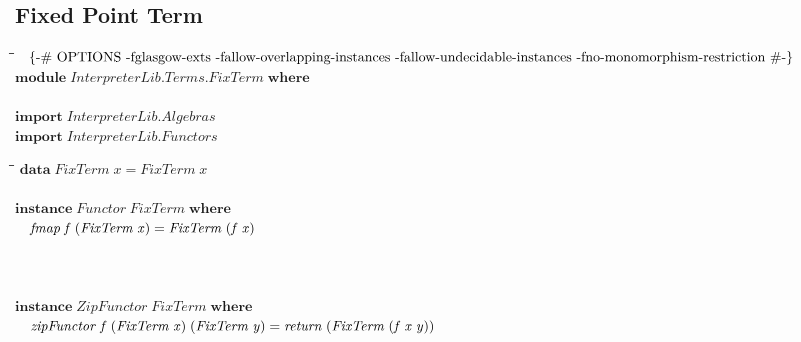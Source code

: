 \documentclass[10pt]{article}
\newlength{\lwidth}\setlength{\lwidth}{4.5cm}
\newlength{\cwidth}\setlength{\cwidth}{8mm} %
\newcommand{\Conid}[1]{\mathit{#1}}
\newcommand{\Varid}[1]{\mathit{#1}}
\begin{document}
\subsection{Fixed Point Term}
\begin{tabbing}
\qquad\=\hspace{\lwidth}\=\hspace{\cwidth}\=\+\kill
${\mbox{\enskip\{-\# OPTIONS -fglasgow-exts -fallow-overlapping-instances -fallow-undecidable-instances -fno-monomorphism-restriction  \#-\}\enskip}}$\\
${\mathbf{module}\;\Conid{\Conid{InterpreterLib}.\Conid{Terms}.FixTerm}\;\mathbf{where}}$\\
${}$\\
${\mathbf{import}\;\Conid{\Conid{InterpreterLib}.Algebras}}$\\
${\mathbf{import}\;\Conid{\Conid{InterpreterLib}.Functors}}$
\end{tabbing}

\begin{tabbing}
\qquad\=\hspace{\lwidth}\=\hspace{\cwidth}\=\+\kill
${\mathbf{data}\;\Conid{FixTerm}\;\Varid{x}\mathrel{=}\Conid{FixTerm}\;\Varid{x}}$\\
${}$\\
${\mathbf{instance}\;\Conid{Functor}\;\Conid{FixTerm}\;\mathbf{where}}$\\
${\hskip1.00em\relax\Varid{fmap}\;\Varid{f}\;(\Conid{FixTerm}\;\Varid{x})\mathrel{=}\Conid{FixTerm}\;(\Varid{f}\;\Varid{x})}$\\
${}$\\
${}$\\
${}$\\
${\mathbf{instance}\;\Conid{ZipFunctor}\;\Conid{FixTerm}\;\mathbf{where}}$\\
${\hskip1.00em\relax\Varid{zipFunctor}\;\Varid{f}\;(\Conid{FixTerm}\;\Varid{x})\;(\Conid{FixTerm}\;\Varid{y})\mathrel{=}\Varid{return}\;(\Conid{FixTerm}\;(\Varid{f}\;\Varid{x}\;\Varid{y}))}$
\end{tabbing}
\end{document}
